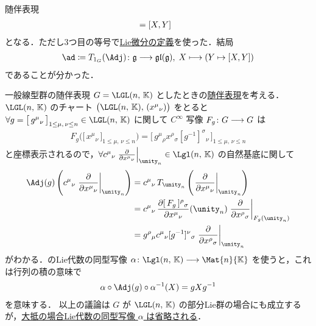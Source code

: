 \documentclass[TQFT_main]{subfiles}
\begin{document}
\begin{myexample}[label=def:Lie-adj]{随伴表現}
\begin{align}
        &= \comm{X}{Y}
    \end{align}
    となる．ただし3つ目の等号で\hyperref[def:Liedv]{Lie微分の定義}を使った．結局
    \begin{align}
        \ad \coloneqq T_{1_G} (\Adj) \colon \mathfrak{g} \lto \mathfrak{gl}(\mathfrak{g}),\; X \lmto (Y \mapsto \comm{X}{Y})
    \end{align}
    であることが分かった．
    
\end{myexample}

\begin{myexample}[label=ex:gl-adj]{一般線型群の随伴表現}
    $G = \LGL (n,\, \mathbb{K})$ としたときの\hyperref[def:Lie-adj]{随伴表現}を考える．$\LGL(n,\, \mathbb{K})$ のチャート $\bigl( \LGL(n,\, \mathbb{K}),\, (x^\mu{}_\nu) \bigr)$ をとると $\forall g = \bigl[\, g^\mu{}_\nu \,\bigr]_{1 \le \mu,\, \nu \le n} \in \LGL(n,\, \mathbb{K})$ に関して $C^\infty$ 写像 $F_g \colon G \longrightarrow G$ は
    \begin{align}
        F_g \bigl( \bigl[\, x^\mu{}_\nu \,\bigr]_{1 \le \mu,\, \nu \le n}  \bigr) = \bigl[ \, g^\mu{}_\rho x^\rho{}_\sigma [g^{-1}]^\sigma{}_\nu \, \bigr]_{1 \le \mu,\, \nu \le n}
    \end{align}
    と座標表示されるので，$\forall c^\mu{}_\nu \eval{\pdv{}{x^\mu{}_\nu}}_{\unity_n} \in \Lgl (n,\, \mathbb{K})$ の自然基底に関して
    \begin{align}
        \Adj (g) \left( c^\mu{}_\nu \eval{\pdv{}{x^\mu{}_\nu}}_{\unity_n} \right) 
        &= c^\mu{}_\nu\, T_{\unity_n} \left( \eval{\pdv{}{x^\mu{}_\nu}}_{\unity_n} \right) \\
        &= c^\mu{}_\nu\, \pdv{[\, F_g \,]^\rho{}_\sigma}{x^\mu{}_\nu}()(\unity_n) \eval{\pdv{}{x^\rho{}_\sigma}}_{F_g(\unity_n)} \\
        &= g^\rho{}_\mu c^\mu{}_\nu [g^{-1}]^\nu{}_\sigma \eval{\pdv{}{x^\rho{}_\sigma}}_{\unity_n}
    \end{align}
    がわかる．のLie代数の同型写像 $\alpha \colon \Lgl(n,\, \mathbb{K}) \lto \Mat{n}{\mathbb{K}}$ を使うと，これは行列の積の意味で
    \begin{align}
        \alpha \circ \Adj (g)  \circ \alpha^{-1} (X) = g X g^{-1}
    \end{align}
    を意味する．
    以上の議論は $G$ が $\LGL(n,\, \mathbb{K})$ の部分Lie群の場合にも成立するが，\underline{大抵の場合Lie代数の同型写像 $\alpha$ は省略される}．
\end{myexample}
\end{document}
